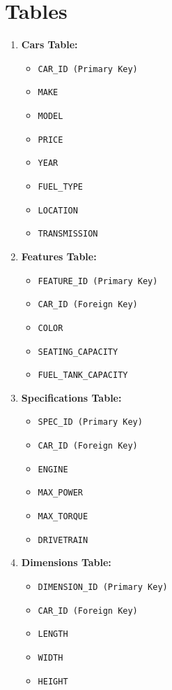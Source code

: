 \documentclass[12pt]{report}
\begin{document}
    \section{Tables}
    \begin{enumerate}
     \item \textbf{Cars Table:}
    \begin{itemize}
        \item \texttt{CAR\_ID (Primary Key)}
        \item \texttt{MAKE}
        \item \texttt{MODEL}
        \item \texttt{PRICE}
        \item \texttt{YEAR}
        \item \texttt{FUEL\_TYPE}
        \item \texttt{LOCATION}
        \item \texttt{TRANSMISSION}
    \end{itemize}

    \item \textbf{Features Table:}
    \begin{itemize}
        \item \texttt{FEATURE\_ID (Primary Key)}
        \item \texttt{CAR\_ID (Foreign Key)}
        \item \texttt{COLOR}
        \item \texttt{SEATING\_CAPACITY}
        \item \texttt{FUEL\_TANK\_CAPACITY}
    \end{itemize}

    \item \textbf{Specifications Table:}
    \begin{itemize}
        \item \texttt{SPEC\_ID (Primary Key)}
        \item \texttt{CAR\_ID (Foreign Key)}
        \item \texttt{ENGINE}
        \item \texttt{MAX\_POWER}
        \item \texttt{MAX\_TORQUE}
        \item \texttt{DRIVETRAIN}
    \end{itemize}

    \item \textbf{Dimensions Table:}
    \begin{itemize}
        \item \texttt{DIMENSION\_ID (Primary Key)}
        \item \texttt{CAR\_ID (Foreign Key)}
        \item \texttt{LENGTH}
        \item \texttt{WIDTH}
        \item \texttt{HEIGHT}
    \end{itemize}


\end{enumerate}
\end{document}
